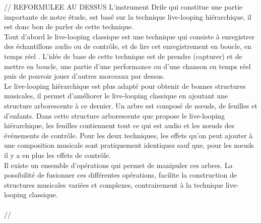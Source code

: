 // REFORMULEE AU DESSUS
L'instrument Drile qui constitue une partie importante de notre étude, est basé sur la technique live-looping hiérarchique, il est donc bon de parler de cette technique.\\
Tout d'abord le live-looping classique est une technique qui consiste à enregistrer des échantillons audio ou de contrôle, et de lire cet enregistrement en boucle, en temps réel . L'idée de base de cette technique est de prendre (capturer) et de mettre en boucle, une partie d'une performance ou d'une chanson en temps réel puis de pouvoir jouer d'autres morceaux par dessus. \\
Le live-looping hiérarchique est plus adapté pour obtenir de bonnes structures musicales, il permet d'améliorer le live-looping classique en ajoutant une structure arborescente à ce dernier. Un arbre est composé de nœuds, de feuilles et d’enfants. Dans cette structure arborescente que propose le live-looping hiérarchique, les feuilles contiennent tout ce qui est audio et les nœuds des événements de contrôle. Pour les deux techniques, les effets qu'on peut ajouter à une composition musicale sont pratiquement identiques sauf que, pour les nœuds il y a en plus les effets de contrôle.\\
Il existe un ensemble d'opérations qui permet de manipuler ces arbres. La possibilité de fusionner ces différentes opérations, facilite la construction de structures musicales variées et complexes, contrairement à la technique live-looping classique.\\
\\
//

